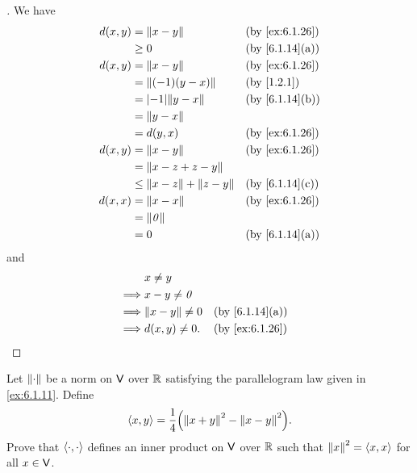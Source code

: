 \begin{proof}[]
  We have
  \begin{align*}
    d(x, y) & = \norm{x - y}                   &  & \by{ex:6.1.26} \\
            & \geq 0                           &  & \by{6.1.14}[a] \\
    d(x, y) & = \norm{x - y}                   &  & \by{ex:6.1.26} \\
            & = \norm{(-1)(y - x)}             &  & \by{1.2.1}     \\
            & = \abs{-1} \norm{y - x}          &  & \by{6.1.14}[b] \\
            & = \norm{y - x}                                       \\
            & = d(y, x)                        &  & \by{ex:6.1.26} \\
    d(x, y) & = \norm{x - y}                   &  & \by{ex:6.1.26} \\
            & = \norm{x - z + z - y}                               \\
            & \leq \norm{x - z} + \norm{z - y} &  & \by{6.1.14}[c] \\
    d(x, x) & = \norm{x - x}                   &  & \by{ex:6.1.26} \\
            & = \norm{\zv}                                         \\
            & = 0                              &  & \by{6.1.14}[a]
  \end{align*}
  and
  \begin{align*}
             & x \neq y                                \\
    \implies & x - y \neq \zv                          \\
    \implies & \norm{x - y} \neq 0 &  & \by{6.1.14}[a] \\
    \implies & d(x, y) \neq 0.     &  & \by{ex:6.1.26}
  \end{align*}
\end{proof}

\begin{ex}\label{ex:6.1.27}
  Let \(\left\lVert\cdot\right\rVert\) be a norm on \(\mathsf{V}\) over \(\mathbb{R}\) satisfying the parallelogram law given in \cref{ex:6.1.11}.
  Define
  \[
    \inn{x, y} = \frac{1}{4} \pa{\norm{x + y}^2 - \norm{x - y}^2}.
  \]
  Prove that \(\left\langle\cdot, \cdot\right\rangle\) defines an inner product on \(\mathsf{V}\) over \(\mathbb{R}\) such that \(\left\lVert x\right\rVert^2 = \left\langle x, x\right\rangle\) for all \(x \in \mathsf{V}\).
\end{ex}

